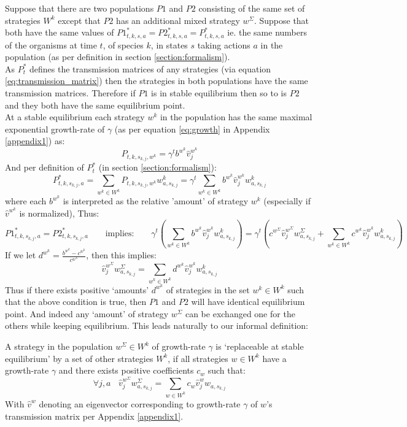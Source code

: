 Suppose that there are two populations $P1$ and $P2$ consisting of the same set of strategies $W^k$ except that $P2$ has an additional mixed strategy $w^\Sigma$.
Suppose that both have the same values of $P1^*_{t,k,s,a} = P2^*_{t,k,s,a} = P^*_{t,k,s,a}$ ie. the same numbers of the organisms at time $t$, of species $k$, in states $s$ taking actions $a$ in the population (as per definition in section \ref{section:formalism}). \\
As $P^*_t$ defines the transmission matrices of any strategies (via equation \ref{eq:transmission_matrix}) then the strategies in both populations have the same transmission matrices.
Therefore if $P1$ is in stable equilibrium then so to is $P2$ and they both have the same equilibrium point.\\
At a stable equilibrium each strategy $w^k$ in the population has the same maximal exponential growth-rate of $\gamma$ (as per equation \ref{eq:growth} in Appendix \ref{appendix1}) as:
$$P_{t,k,s_{k,j},w^k}= \gamma^tb^{w^k} \hat{v}^{w^k}_j$$ 
And per definition of $P^*_t$ (in section \ref{section:formalism}):
$$P^*_{t,k,s_{k,j},a} = \sum_{w^k\in W^k}P_{t,k,s_{k,j},w^k}w^k_{a,s_{k,j}} = \gamma^t\sum_{w^k\in W^k} b^{w^k} \hat{v}^{w^k}_jw^k_{a,s_{k,j}}$$
where each $b^{w^k}$ is interpreted as the relative 'amount' of strategy $w^k$ (especially if $\hat{v}^{w^k}$ is normalized), Thus:
$$P1^*_{t,k,s_{k,j},a} = P2^*_{t,k,s_{k,j},a}~~~~~~~~~\text{implies:}~~~~~~~~~\gamma^t\left(\sum_{w^k\in W^k} b^{w^k} \hat{v}^{w^k}_jw^k_{a,s_{k,j}}\right)=\gamma^t\left(c^{w^\Sigma}\hat{v}^{w^\Sigma}_jw^\Sigma_{a,s_{k,j}} + \sum_{w^k\in W^k} c^{w^k} \hat{v}^{w^k}_jw^k_{a,s_{k,j}} \right)$$
If we let $d^{w^k}=\frac{b^{w^k}-c^{w^k}}{c^{w^\Sigma}}$, then this implies:
$$ \hat{v}^{w^\Sigma}_jw^\Sigma_{a,s_{k,j}} = \sum_{w^k\in W^k} d^{w^k} \hat{v}^{w^k}_jw^k_{a,s_{k,j}} $$
Thus if there exists positive `amounts' $d^{w^k}$ of strategies in the set $w^k\in W^k$ such that the above condition is true, then $P1$ and $P2$ will have identical equilibrium point.
And indeed any `amount' of strategy $w^\Sigma$ can be exchanged one for the others while keeping equilibrium. This leads naturally to our informal definition:

\begin{Definition}\label{def1}
A strategy in the population $w^\Sigma\in W^k$ of growth-rate $\gamma$ is `replaceable at stable equilibrium' by a set of other strategies $W^k$, if all strategies $w\in W^k$ have a growth-rate $\gamma$ and there exists positive coefficients $c_{w}$ such that:
$$\forall j,a~~~~ \hat{v}^{w^\Sigma}_jw^\Sigma_{a,s_{k,j}} = \sum_{w\in W^k}c_w\hat{v}^w_jw_{a,s_{k,j}} $$
With $\hat{v}^w$ denoting an eigenvector corresponding to growth-rate $\gamma$ of $w$'s transmission matrix per Appendix \ref{appendix1}.
\end{Definition}

